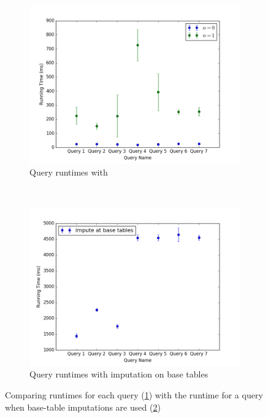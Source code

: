 \begin{figure}
\begin{subfigure}{\linewidth}
\includegraphics[width=\columnwidth]{figures/running_times_imputedb.png}
\caption{Query runtimes with \ProjectName{}}
\label{subfig:project-runtime-queries}
\end{subfigure}
~
\begin{subfigure}{\linewidth}
\includegraphics[width=\columnwidth]{figures/running_times_base_tables.png}
\caption{Query runtimes with imputation on base tables}
\label{subfig:base-runtime-queries}
\end{subfigure}
\caption{Comparing \ProjectName{} runtimes for each query (\ref{subfig:project-runtime-queries}) with the runtime for a query when base-table imputations are used (\ref{subfig:base-runtime-queries})}
\label{fig:runtimes}
\end{figure}

